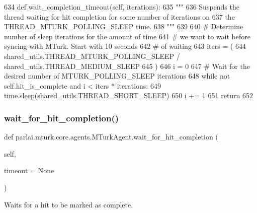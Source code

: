 \begin{DoxyCode}
634     \textcolor{keyword}{def }wait\_completion\_timeout(self, iterations):
635         \textcolor{stringliteral}{"""}
636 \textcolor{stringliteral}{        Suspends the thread waiting for hit completion for some number of iterations on}
637 \textcolor{stringliteral}{        the THREAD\_MTURK\_POLLING\_SLEEP time.}
638 \textcolor{stringliteral}{        """}
639 
640         \textcolor{comment}{# Determine number of sleep iterations for the amount of time}
641         \textcolor{comment}{# we want to wait before syncing with MTurk. Start with 10 seconds}
642         \textcolor{comment}{# of waiting}
643         iters = (
644             shared\_utils.THREAD\_MTURK\_POLLING\_SLEEP / shared\_utils.THREAD\_MEDIUM\_SLEEP
645         )
646         i = 0
647         \textcolor{comment}{# Wait for the desired number of MTURK\_POLLING\_SLEEP iterations}
648         \textcolor{keywordflow}{while} \textcolor{keywordflow}{not} self.hit\_is\_complete \textcolor{keywordflow}{and} i < iters * iterations:
649             time.sleep(shared\_utils.THREAD\_SHORT\_SLEEP)
650             i += 1
651         \textcolor{keywordflow}{return}
652 
\end{DoxyCode}
\mbox{\label{classparlai_1_1mturk_1_1core_1_1agents_1_1MTurkAgent_a562fdfdb24a4e2274d45bd4a7aa7cfff}} 
\subsubsection{\texorpdfstring{wait\+\_\+for\+\_\+hit\+\_\+completion()}{wait\_for\_hit\_completion()}}
{\footnotesize\ttfamily def parlai.\+mturk.\+core.\+agents.\+M\+Turk\+Agent.\+wait\+\_\+for\+\_\+hit\+\_\+completion (\begin{DoxyParamCaption}\item[{}]{self,  }\item[{}]{timeout = {\ttfamily None} }\end{DoxyParamCaption})}

\begin{DoxyVerb}Waits for a hit to be marked as complete.
\end{DoxyVerb}
 

